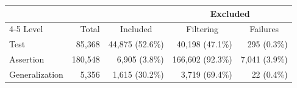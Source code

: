   \renewcommand{\theHreporttablerow}{tab-exclusions-breakdown-extended.\arabic{reporttablerow}}
  \setcounter{reporttablerow}{0}
  \begin{tabular*}{\linewidth}{@{\hspace{\tabcolsep}\extracolsep{\fill}}lrrrr}
  \toprule
   &  &  & \multicolumn{2}{c}{Excluded} \\
  \cmidrule(lr){4-5}
  Level & Total & \multicolumn{1}{c}{Included} & \multicolumn{1}{c}{Filtering} & \multicolumn{1}{c}{Failures} \\
  \midrule
  {reporttablerow}\label{tabrow:tab-exclusions-breakdown-extended:Test}Test & 85,368 & 44,875\; (52.6\%) & 40,198\; (47.1\%) & 295\; (0.3\%) \\
  {reporttablerow}\label{tabrow:tab-exclusions-breakdown-extended:Assertion}Assertion & 180,548 & 6,905\; (\phantom{0}3.8\%) & 166,602\; (92.3\%) & 7,041\; (3.9\%) \\
  {reporttablerow}\label{tabrow:tab-exclusions-breakdown-extended:Generalization}Generalization & 5,356 & 1,615\; (30.2\%) & 3,719\; (69.4\%) & 22\; (0.4\%) \\
  \bottomrule
  \end{tabular*}
